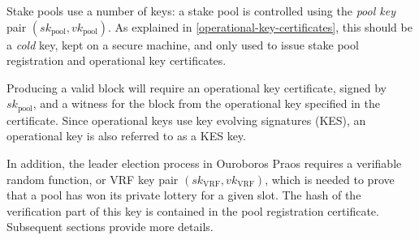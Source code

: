 \documentclass[11pt,a4paper,dvipsnames,twosided]{article}
\begin{document}
Stake pools use a number of keys: a stake pool is controlled using the
\emph{pool key} pair \((sk_\text{pool}, vk_\text{pool})\). As explained in
\cref{operational-key-certificates}, this should be a \emph{cold} key, kept on a
secure machine, and only used to issue stake pool registration and operational
key certificates.

Producing a valid block will require an operational key certificate, signed by
\(sk_\text{pool}\), and a witness for the block from the operational key
specified in the certificate. Since operational keys use key evolving signatures
(KES), an operational key is also referred to as a KES key.

In addition, the leader election process in Ouroboros Praos requires a
verifiable random function, or VRF key pair \((sk_\text{VRF}, vk_\text{VRF})\),
which is needed to prove that a pool has won its private lottery for a given
slot. The hash of the verification part  of this key is
contained in the pool registration certificate.
%
Subsequent sections provide more details.
\end{document}
